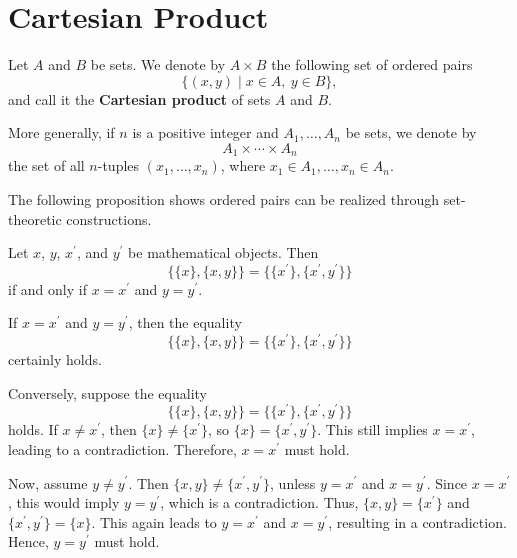 \section{Cartesian Product}

\begin{definitionenv}
Let \(A\) and \(B\) be sets. We denote by \(A \times B\) the following set of ordered pairs
\[
\{(x,  y) \mid x \in A, \ y \in B\}, 
\]
and call it the \textbf{Cartesian product} of sets \(A\) and \(B\).

More generally,  if \(n\) is a positive integer and \(A_1,  \ldots,  A_n\) be sets,  we denote by
\[
A_1 \times \cdots \times A_n
\]
the set of all \(n\)-tuples \((x_1,  \ldots,  x_n)\),  where \(x_1 \in A_1,  \ldots,  x_n \in A_n\).
\end{definitionenv}

The following proposition shows ordered pairs can be realized through set-theoretic constructions.

\begin{propositionenv}
Let \(x\),  \(y\),  \(x^{\prime}\),  and \(y^{\prime}\) be mathematical objects. Then
\[
\{\{x\}, \{x, y\}\}=\{\{x^{\prime}\}, \{x^{\prime}, y^{\prime}\}\}
\]
if and only if \(x=x^{\prime}\) and \(y=y^{\prime}\).
\end{propositionenv}

\begin{proofenv}
If \(x=x^{\prime}\) and \(y=y^{\prime}\),  then the equality
\[
\{\{x\}, \{x, y\}\}=\{\{x^{\prime}\}, \{x^{\prime}, y^{\prime}\}\}
\]
certainly holds.

Conversely,  suppose the equality
\[
\{\{x\}, \{x, y\}\}=\{\{x^{\prime}\}, \{x^{\prime}, y^{\prime}\}\}
\]
holds. If \(x\neq x^{\prime}\),  then \(\{x\}\neq\{x^{\prime}\}\),  so \(\{x\}=\{x^{\prime}, y^{\prime}\}\). This still implies \(x=x^{\prime}\),  leading to a contradiction. Therefore,  \(x=x^{\prime}\) must hold.

Now,  assume \(y\neq y^{\prime}\). Then \(\{x, y\}\neq\{x^{\prime}, y^{\prime}\}\),  unless \(y=x^{\prime}\) and \(x=y^{\prime}\). Since \(x=x^{\prime}\),  this would imply \(y=y^{\prime}\),  which is a contradiction. Thus,  \(\{x, y\}=\{x^{\prime}\}\) and \(\{x^{\prime}, y^{\prime}\}=\{x\}\). This again leads to \(y=x^{\prime}\) and \(x=y^{\prime}\),  resulting in a contradiction. Hence,  \(y=y^{\prime}\) must hold.
\end{proofenv}